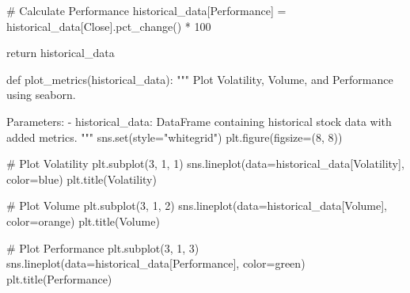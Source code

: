 \documentclass[
  letterpaper,
  DIV=11,
  numbers=noendperiod]{scrreprt}
\newenvironment{Shaded}{\begin{snugshade}}{\end{snugshade}}
\newcommand{\BuiltInTok}[1]{\textcolor[rgb]{0.00,0.23,0.31}{#1}}
\newcommand{\CommentTok}[1]{\textcolor[rgb]{0.37,0.37,0.37}{#1}}
\newcommand{\ControlFlowTok}[1]{\textcolor[rgb]{0.00,0.23,0.31}{#1}}
\newcommand{\DecValTok}[1]{\textcolor[rgb]{0.68,0.00,0.00}{#1}}
\newcommand{\KeywordTok}[1]{\textcolor[rgb]{0.00,0.23,0.31}{#1}}
\newcommand{\NormalTok}[1]{\textcolor[rgb]{0.00,0.23,0.31}{#1}}
\newcommand{\OperatorTok}[1]{\textcolor[rgb]{0.37,0.37,0.37}{#1}}
\newcommand{\StringTok}[1]{\textcolor[rgb]{0.13,0.47,0.30}{#1}}
\begin{document}
\begin{Shaded}
\begin{Highlighting}[]
    \CommentTok{\# Calculate Performance}
\NormalTok{    historical\_data[}\StringTok{\textquotesingle{}Performance\textquotesingle{}}\NormalTok{] }\OperatorTok{=}\NormalTok{ historical\_data[}\StringTok{\textquotesingle{}Close\textquotesingle{}}\NormalTok{].pct\_change() }\OperatorTok{*} \DecValTok{100}

    \ControlFlowTok{return}\NormalTok{ historical\_data}

\KeywordTok{def}\NormalTok{ plot\_metrics(historical\_data):}
    \CommentTok{"""}
\CommentTok{    Plot Volatility, Volume, and Performance using seaborn.}

\CommentTok{    Parameters:}
\CommentTok{    {-} historical\_data: DataFrame containing historical stock data with added metrics.}
\CommentTok{    """}
\NormalTok{    sns.}\BuiltInTok{set}\NormalTok{(style}\OperatorTok{=}\StringTok{"whitegrid"}\NormalTok{)}
\NormalTok{    plt.figure(figsize}\OperatorTok{=}\NormalTok{(}\DecValTok{8}\NormalTok{, }\DecValTok{8}\NormalTok{))}

    \CommentTok{\# Plot Volatility}
\NormalTok{    plt.subplot(}\DecValTok{3}\NormalTok{, }\DecValTok{1}\NormalTok{, }\DecValTok{1}\NormalTok{)}
\NormalTok{    sns.lineplot(data}\OperatorTok{=}\NormalTok{historical\_data[}\StringTok{\textquotesingle{}Volatility\textquotesingle{}}\NormalTok{], color}\OperatorTok{=}\StringTok{\textquotesingle{}blue\textquotesingle{}}\NormalTok{)}
\NormalTok{    plt.title(}\StringTok{\textquotesingle{}Volatility\textquotesingle{}}\NormalTok{)}

    \CommentTok{\# Plot Volume}
\NormalTok{    plt.subplot(}\DecValTok{3}\NormalTok{, }\DecValTok{1}\NormalTok{, }\DecValTok{2}\NormalTok{)}
\NormalTok{    sns.lineplot(data}\OperatorTok{=}\NormalTok{historical\_data[}\StringTok{\textquotesingle{}Volume\textquotesingle{}}\NormalTok{], color}\OperatorTok{=}\StringTok{\textquotesingle{}orange\textquotesingle{}}\NormalTok{)}
\NormalTok{    plt.title(}\StringTok{\textquotesingle{}Volume\textquotesingle{}}\NormalTok{)}

    \CommentTok{\# Plot Performance}
\NormalTok{    plt.subplot(}\DecValTok{3}\NormalTok{, }\DecValTok{1}\NormalTok{, }\DecValTok{3}\NormalTok{)}
\NormalTok{    sns.lineplot(data}\OperatorTok{=}\NormalTok{historical\_data[}\StringTok{\textquotesingle{}Performance\textquotesingle{}}\NormalTok{], color}\OperatorTok{=}\StringTok{\textquotesingle{}green\textquotesingle{}}\NormalTok{)}
\NormalTok{    plt.title(}\StringTok{\textquotesingle{}Performance\textquotesingle{}}\NormalTok{)}


\end{Highlighting}
\end{Shaded}
\end{document}
